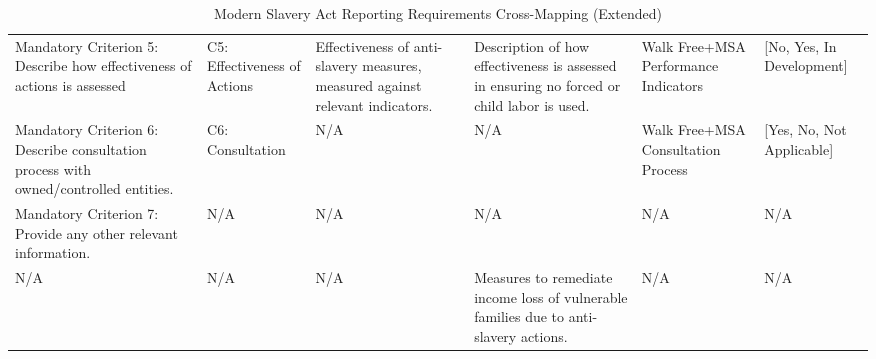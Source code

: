 \documentclass{article}
\begin{document}
\begin{landscape}
\begin{table}[ht]
\begin{tabular}{p{3cm}p{2cm}p{2.5cm}p{2.5cm}p{2.5cm}p{2cm}}
Mandatory Criterion 5: Describe how effectiveness of actions is assessed 
& C5: Effectiveness of Actions 
& Effectiveness of anti-slavery measures, measured against relevant indicators. 
& Description of how effectiveness is assessed in ensuring no forced or child labor is used. 
& Walk Free+MSA Performance Indicators 
& [No, Yes, In Development] \\

Mandatory Criterion 6: Describe consultation process with owned/controlled entities. 
& C6: Consultation & N/A & N/A 
& Walk Free+MSA Consultation Process 
& [Yes, No, Not Applicable] \\

Mandatory Criterion 7: Provide any other relevant information. 
& N/A & N/A & N/A & N/A & N/A \\

N/A & N/A & N/A & Measures to remediate income loss of vulnerable families due to anti-slavery actions. 
& N/A & N/A \\

\bottomrule
\end{tabular}
\caption{Modern Slavery Act Reporting Requirements Cross-Mapping (Extended)}
\label{tab:legal_mapping_extended}
\end{table}
\end{landscape}
\end{document}
